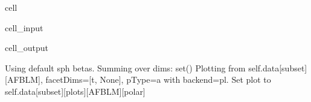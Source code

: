 \documentclass[letterpaper,table,10pt,english]{jupyterBook}
\begin{document}
\begin{sphinxuseclass}{cell}\begin{sphinxVerbatimInput}

\begin{sphinxuseclass}{cell_input}
\begin{sphinxVerbatim}[commandchars=\\\{\}]
     
             \PYG{p}{[}\PYG{p}{]}       
\end{sphinxVerbatim}

\end{sphinxuseclass}\end{sphinxVerbatimInput}
\begin{sphinxVerbatimOutput}

\begin{sphinxuseclass}{cell_output}
\begin{sphinxVerbatim}[commandchars=\\\{\}]
Using default sph betas.
Summing over dims: set()
Plotting from self.data[subset][AFBLM], facetDims=[\PYGZsq{}t\PYGZsq{}, None], pType=a with backend=pl.
Set plot to self.data[\PYGZsq{}subset\PYGZsq{}][\PYGZsq{}plots\PYGZsq{}][\PYGZsq{}AFBLM\PYGZsq{}][\PYGZsq{}polar\PYGZsq{}]
\end{sphinxVerbatim}

\end{sphinxuseclass}\end{sphinxVerbatimOutput}

\end{sphinxuseclass}
\sphinxstepscope
\end{document}
